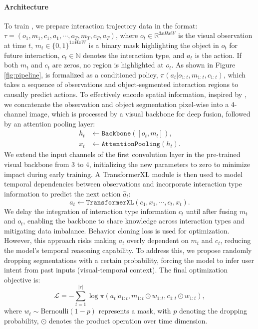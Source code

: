 \paragraph{\agent Architecture}
To train \agent, we prepare interaction trajectory data in the format:
$\tau = (o_1, m_1, c_1, a_1, \cdots, o_T, m_T, c_T, a_T)$,
where $o_t \in \mathbb{R}^{3xHxW}$ is the visual observation at time $t$, $m_t \in \{0, 1\}^{1xHxW}$ is a binary mask highlighting the object in $o_t$ for future interaction, $c_t \in \mathbb{N}$ denotes the interaction type, and $a_t$ is the action. If both $m_t$ and $c_t$ are zeros, no region is highlighted at $o_t$. 
As shown in Figure \ref{fig:pipeline}, \agent is formalized as a conditioned policy, $\pi(a_t | o_{1:t}, m_{1:t}, c_{1:t})$, which takes a sequence of observations and object-segmented interaction regions to causally predict actions. To effectively encode spatial information, inspired by \cite{controlnet}, we concatenate the observation and object segmentation pixel-wise into a 4-channel image, which is processed by a visual backbone for deep fusion, followed by an attention pooling layer: 
\begin{align}
h_t &\leftarrow \texttt{Backbone}([o_t, m_t]), \\
x_t &\leftarrow \texttt{AttentionPooling}(h_t). 
\end{align}
We extend the input channels of the first convolution layer in the pre-trained visual backbone from 3 to 4, initializing the new parameters to zero to minimize impact during early training. A TransformerXL \citep{transformerxl, vpt} module is then used to model temporal dependencies between observations and incorporate interaction type information to predict the next action $\hat{a}_t$: 
\begin{equation}
    \hat{a}_t \leftarrow \texttt{TransformerXL}(c_1, x_1, \cdots, c_t, x_t). 
\end{equation}
We delay the integration of interaction type information $c_t$ until after fusing $m_t$ and $o_t$, enabling the backbone to share knowledge across interaction types and mitigating data imbalance. Behavior cloning loss is used for optimization. However, this approach risks making $a_t$ overly dependent on $m_t$ and $c_t$, reducing the model's temporal reasoning capability. To address this, we propose randomly dropping segmentations with a certain probability, forcing the model to infer user intent from past inputs (visual-temporal context). The final optimization objective is: 
\begin{equation}
    \mathcal{L} = -\sum_{t=1}^{|\tau|} \log \pi(a_t | o_{1:t}, m_{1:t} \odot w_{1:t}, c_{1:t} \odot w_{1:t}), 
\end{equation}
where $w_t \sim \text{Bernoulli}(1-p)$ represents a mask, with $p$ denoting the dropping probability, $\odot$ denotes the product operation over time dimension. 

